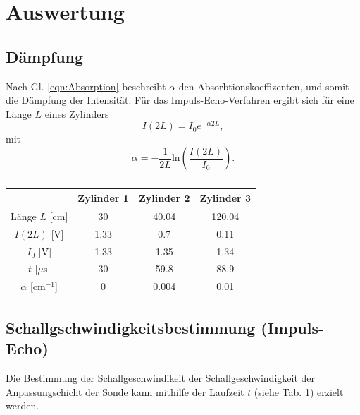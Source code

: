 \section{Auswertung}
\subsection{Dämpfung}
Nach Gl. \ref{eqn:Absorption} beschreibt $\alpha$ den Absorbtionskoeffizenten, und
somit die Dämpfung der Intensität.
Für das Impuls-Echo-Verfahren ergibt sich für eine Länge $L$ eines Zylinders
\begin{equation}
    I(2L)=I_0e^{-\alpha 2L},
\end{equation}
mit
\begin{equation}
    \alpha=-\frac{1}{2L}\text{ln}\left(\frac{I(2L)}{I_0}\right).
\end{equation}
\begin{table}
    \centering
    \begin{tabular}{c|c c c}
        \toprule
        &Zylinder 1 &Zylinder 2&Zylinder 3\\
        \midrule
        Länge $L$ [cm] &30&40.04&120.04\\
        $I(2L)$ [V] &1.33&0.7&0.11\\
        $I_0$ [V]& 1.33&1.35&1.34\\
        $t$ [$\mu$s]&30&59.8&88.9\\
        \midrule
        $\alpha$ [cm$^{-1}$]& 0&0.004&0.01\\
        \bottomrule
    \end{tabular}
    \caption{}
    \label{tab:wertetabelle}
\end{table}

\subsection{Schallgschwindigkeitsbestimmung (Impuls-Echo)}
Die Bestimmung der Schallgeschwindikeit der Schallgeschwindigkeit der Anpassungschicht
der Sonde kann mithilfe der Laufzeit $t$ (siehe Tab. \ref{tab:wertetabelle}) erzielt werden.


